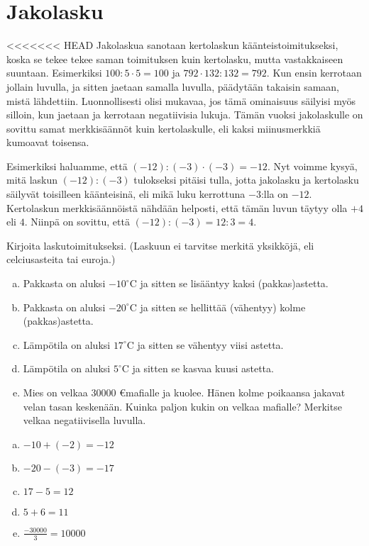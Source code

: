 \section{Jakolasku}

<<<<<<< HEAD
Jakolaskua sanotaan kertolaskun käänteistoimitukseksi, koska se tekee tekee saman toimituksen kuin kertolasku, mutta vastakkaiseen suuntaan. Esimerkiksi $100:5\cdot 5=100$ ja $792\cdot 132:132=792$. Kun ensin kerrotaan jollain luvulla, ja sitten jaetaan samalla luvulla, päädytään takaisin samaan, mistä lähdettiin. Luonnollisesti olisi mukavaa, jos tämä ominaisuus säilyisi myös silloin, kun jaetaan ja kerrotaan negatiivisia lukuja. Tämän vuoksi jakolaskulle on sovittu samat merkkisäännöt kuin kertolaskulle, eli kaksi miinusmerkkiä kumoavat toisensa.

Esimerkiksi haluamme, että $(-12):(-3)\cdot (-3)=-12$. Nyt voimme kysyä, mitä laskun $(-12):(-3)$ tulokseksi pitäisi tulla, jotta jakolasku ja kertolasku säilyvät toisilleen käänteisinä, eli mikä luku kerrottuna $-3$:lla on $-12$. Kertolaskun merkkisäännöistä nähdään helposti, että tämän luvun täytyy olla $+4$ eli $4$. Niinpä on sovittu, että $(-12):(-3)=12:3=4$.

\begin{tehtava}
Kirjoita laskutoimitukseksi. (Laskuun ei tarvitse merkitä yksikköjä, eli celciusasteita tai euroja.)
\begin{enumerate}[a)]
\item Pakkasta on aluksi $-10^{\circ}$C ja sitten se lisääntyy kaksi (pakkas)astetta.
\item Pakkasta on aluksi $-20^{\circ}$C ja sitten se hellittää (vähentyy) kolme (pakkas)astetta.
\item Lämpötila on aluksi $17^{\circ}$C ja sitten se vähentyy viisi astetta.
\item Lämpötila on aluksi $5^{\circ}$C ja sitten se kasvaa kuusi astetta.
\item Mies on velkaa $30 000$ \euro mafialle ja kuolee. Hänen kolme poikaansa jakavat velan tasan keskenään. Kuinka paljon kukin on velkaa mafialle? Merkitse velkaa negatiivisella luvulla.
\end{enumerate}
\begin{vastaus}
\begin{enumerate}[a)]
\item $-10+(-2)=-12$
\item $-20-(-3)=-17$
\item $17-5=12$
\item $5+6=11$
\item $\frac{-30 000}{3}=10 000$
\end{enumerate}
\end{vastaus}
\end{tehtava}


